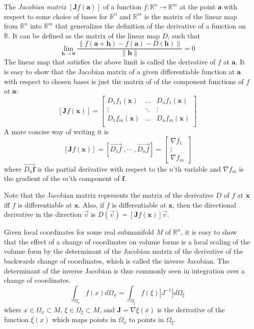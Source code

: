 \documentclass{article}
\begin{document}
\newcommand{\pt}{\mathbf}
\newcommand{\R}{\mathbb{R}}

The \emph{Jacobian matrix} $[\mathbf{J}f(\pt{a})]$ of a function $f\colon\R^n\rightarrow\R^m$ at the point $\pt{a}$ with respect to some choice of bases for $\R^n$ and $\R^m$ is the matrix of the linear map from $\R^n$ into $\R^m$ that generalizes the definition of the derivative of a function on $\R$. It can be defined as the matrix of the linear map $D$, such that 
$$\lim_{\pt{h}\rightarrow\pt{0}}\frac{\|f(\pt{a + h}) - f(\pt{a}) - D(\pt{h})\|}{\|\pt{h}\|} = 0$$
The linear map that satisfies the above limit is called the derivative of $f$ at $\pt{a}$. It is easy to show that the Jacobian matrix of a given differentiable function at $\pt{a}$ with respect to chosen bases is just the matrix of  of the component functions of $f$ at $\pt{a}$:
$$[\mathbf{J}f(\pt{x})]=\left[\begin{array}{ccc}
D_1f_1(\pt{x}) & \dots & D_nf_1(\pt{x})\\
\vdots & \ddots & \vdots\\
D_1f_m(\pt{x}) & \dots & D_nf_m(\pt{x})\\
\end{array}\right]$$
A more concise way of writing it is
$$[\mathbf{J}f(\pt{x})]=[\overrightarrow{D_1 f}\;,\cdots\;, \overrightarrow{D_n f}]=\left[\begin{array}{c}\nabla f_1\\ \vdots\\ \nabla f_m\end{array}\right]$$
where $\overrightarrow{D_n\pt{f}}$ is the partial derivative with respect to the $n$'th variable and $\nabla f_m$ is the gradient of the $m$'th component of $\mathbf{f}$. 

Note that the Jacobian matrix represents the matrix of the derivative $D$ of $f$ at $\pt{x}$ iff $f$ is differentiable at $\pt{x}$. Also, if $f$ is differentiable at $\pt{x}$, then the directional derivative in the direction $\vec{v}$ is $D(\vec{v}) = [\mathbf{J}f(\pt{x})]\vec{v}$.

Given local coordinates for some real submanifold $M$ of $\R^n$, it is easy to show that the effect of a change of coordinates on volume forms is a local scaling of the volume form by the determinant of the Jacobian matrix of the derivative of the backwards change of coordinates, which is called the inverse Jacobian. The determinant of the inverse Jacobian is thus commonly seen in integration over a change of coordinates.
$$\int_{\Omega_x} f(x) d\Omega_x = \int_{\Omega_\xi} f(\xi) |J^{-1}| d\Omega_\xi$$
where $x \in \Omega_x \subset M$, $\xi \in \Omega_\xi \subset M$, and $\mathbf{J} = \nabla \xi(x)$ is the derivative of the function $\xi(x)$ which maps points in $\Omega_x$ to points in $\Omega_\xi$.
\end{document}
